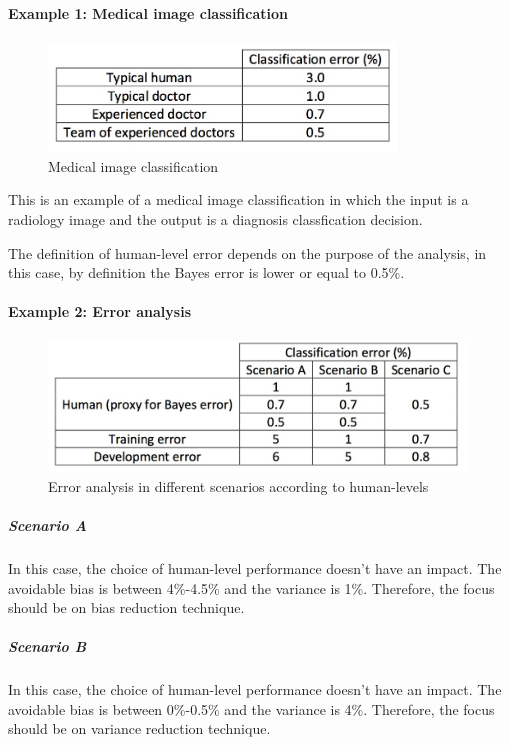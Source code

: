 \documentclass[UTF8]{article}
\begin{document}
\paragraph{Example 1: Medical image classification}
\begin{figure}[htb]
    \centering
    \includegraphics[width=25em]{figures/medical-image-classification}
    \caption{Medical image classification}
    \label{figures/medical-image-classification}
\end{figure}

This is an example of a medical image classification in which the input is a radiology image and
the output is a diagnosis classfication decision.

The definition of human-level error depends on the purpose of the analysis, in this case,
by definition the Bayes error is lower or equal to 0.5\%.

\paragraph{Example 2: Error analysis}

\begin{figure}[htb]
    \centering
    \includegraphics[width=30em]{figures/error-analysis}
    \caption{Error analysis in different scenarios according to human-levels}
    \label{figures/error-analysis}
\end{figure}

\subparagraph{Scenario A}
In this case, the choice of human-level performance doesn't have an impact. The avoidable bias is
between 4\%-4.5\% and the variance is 1\%. Therefore, the focus should be on bias reduction
technique.

\subparagraph{Scenario B}
In this case, the choice of human-level performance doesn't have an impact. The avoidable bias is
between 0\%-0.5\% and the variance is 4\%. Therefore, the focus should be on variance reduction
technique.
\end{document}
